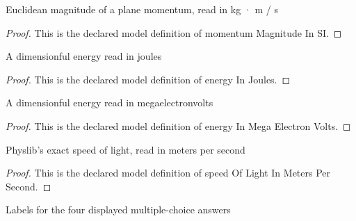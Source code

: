 \begin{definition}
  \label{def:physics:phyx-mini-0531:phyxminiproblems-problemphyxmini0531-momentummagnitudeinsi}
  Euclidean magnitude of a plane momentum, read in kg · m / s
\end{definition}
\begin{proof}
  This is the declared model definition of momentum Magnitude In SI.
\end{proof}
\begin{definition}
  \label{def:physics:phyx-mini-0531:phyxminiproblems-problemphyxmini0531-energyinjoules}
  A dimensionful energy read in joules
\end{definition}
\begin{proof}
  This is the declared model definition of energy In Joules.
\end{proof}
\begin{definition}
  \label{def:physics:phyx-mini-0531:phyxminiproblems-problemphyxmini0531-energyinmegaelectronvolts}
  A dimensionful energy read in megaelectronvolts
\end{definition}
\begin{proof}
  This is the declared model definition of energy In Mega Electron Volts.
\end{proof}
\begin{definition}
  \label{def:physics:phyx-mini-0531:phyxminiproblems-problemphyxmini0531-speedoflightinmeterspersecond}
  Physlib's exact speed of light, read in meters per second
\end{definition}
\begin{proof}
  This is the declared model definition of speed Of Light In Meters Per Second.
\end{proof}
\begin{definition}
  \label{def:physics:phyx-mini-0531:phyxminiproblems-problemphyxmini0531-answerchoice}
  Labels for the four displayed multiple-choice answers
\end{definition}
